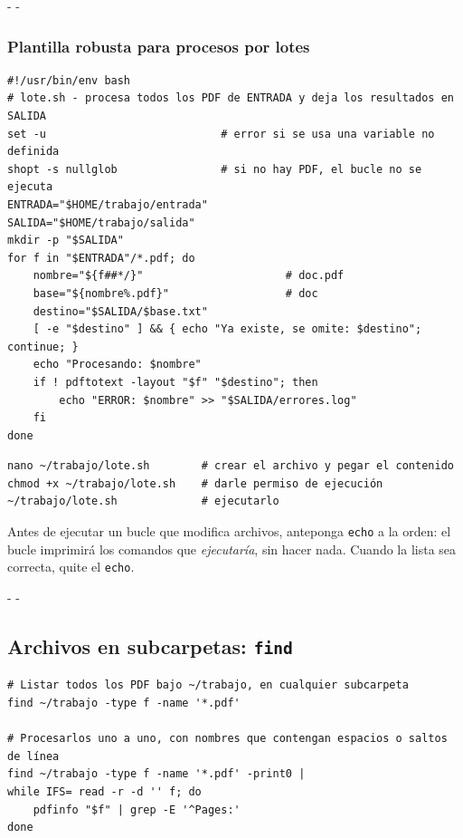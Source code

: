 \documentclass[11pt,a4paper]{article}
\makeatletter
\newcommand{\necesitaespacio}[1]{\par\penalty-100\begingroup
	\setlength{\dimen@}{#1}\dimen@ii\pagegoal\advance\dimen@ii-\pagetotal
	\ifdim\dimen@>\dimen@ii\ifdim\dimen@ii>\z@\vfil\fi\penalty-\@M\fi\endgroup}
\newcommand{\cmd}[1]{\texttt{\textcolor{colcmd}{#1}}}      %
\makeatother
\begin{document}
	\necesitaespacio{6\baselineskip}
	\subsubsection{Plantilla robusta para procesos por lotes}\label{sec:plantilla-lote}
	
	\begin{lstlisting}
#!/usr/bin/env bash
# lote.sh - procesa todos los PDF de ENTRADA y deja los resultados en SALIDA
set -u                           # error si se usa una variable no definida
shopt -s nullglob                # si no hay PDF, el bucle no se ejecuta
ENTRADA="$HOME/trabajo/entrada"
SALIDA="$HOME/trabajo/salida"
mkdir -p "$SALIDA"
for f in "$ENTRADA"/*.pdf; do
    nombre="${f##*/}"                      # doc.pdf
    base="${nombre%.pdf}"                  # doc
    destino="$SALIDA/$base.txt"
    [ -e "$destino" ] && { echo "Ya existe, se omite: $destino"; continue; }
    echo "Procesando: $nombre"
    if ! pdftotext -layout "$f" "$destino"; then
        echo "ERROR: $nombre" >> "$SALIDA/errores.log"
    fi
done
\end{lstlisting}
	
	\begin{lstlisting}
nano ~/trabajo/lote.sh        # crear el archivo y pegar el contenido
chmod +x ~/trabajo/lote.sh    # darle permiso de ejecución
~/trabajo/lote.sh             # ejecutarlo
\end{lstlisting}
	
	\begin{consejo}
		Antes de ejecutar un bucle que modifica archivos, anteponga \cmd{echo} a la orden: el bucle imprimirá los comandos que \emph{ejecutaría}, sin hacer nada. Cuando la lista sea correcta, quite el \cmd{echo}.
	\end{consejo}
	
	\necesitaespacio{8\baselineskip}
	\subsection{Archivos en subcarpetas: \texttt{find}}
	
	\begin{lstlisting}
# Listar todos los PDF bajo ~/trabajo, en cualquier subcarpeta
find ~/trabajo -type f -name '*.pdf'

# Procesarlos uno a uno, con nombres que contengan espacios o saltos de línea
find ~/trabajo -type f -name '*.pdf' -print0 |
while IFS= read -r -d '' f; do
    pdfinfo "$f" | grep -E '^Pages:'
done
\end{lstlisting}
	
\end{document}
